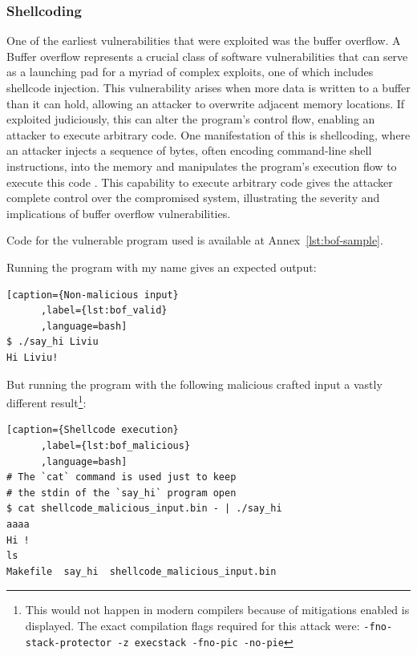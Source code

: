 \documentclass{article}
\begin{document}
\subsubsection{Shellcoding}

One of the earliest vulnerabilities that were exploited was the buffer overflow. A Buffer overflow represents a crucial class of software vulnerabilities that can serve as a launching pad for a myriad of complex exploits, one of which includes shellcode injection. This vulnerability arises when more data is written to a buffer than it can hold, allowing an attacker to overwrite adjacent memory locations. If exploited judiciously, this can alter the program's control flow, enabling an attacker to execute arbitrary code. One manifestation of this is shellcoding, where an attacker injects a sequence of bytes, often encoding command-line shell instructions, into the memory and manipulates the program's execution flow to execute this code \cite{alephone}. This capability to execute arbitrary code gives the attacker complete control over the compromised system, illustrating the severity and implications of buffer overflow vulnerabilities.

Code for the vulnerable program used is available at Annex~\ref{lst:bof-sample}.

Running the program with my name gives an expected output:
\begin{lstlisting}[caption={Non-malicious input}
      ,label={lst:bof_valid}
      ,language=bash]
$ ./say_hi Liviu
Hi Liviu!
\end{lstlisting}

But running the program with the following malicious crafted input a vastly different result\footnote{This would not happen in modern compilers because of mitigations enabled is displayed. The exact compilation flags required for this attack were: \texttt{-fno-stack-protector -z execstack -fno-pic -no-pie}}:
\begin{lstlisting}[caption={Shellcode execution}
      ,label={lst:bof_malicious}
      ,language=bash]
# The `cat` command is used just to keep
# the stdin of the `say_hi` program open
$ cat shellcode_malicious_input.bin - | ./say_hi
aaaa
Hi !
ls
Makefile  say_hi  shellcode_malicious_input.bin
\end{lstlisting}
\end{document}
